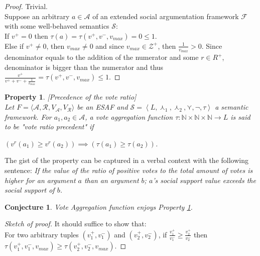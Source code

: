 \documentclass{article}
\newtheorem{property}{Property}
\newtheorem{conjecture}{Conjecture}
\newcommand{\nat}{\mathbb{N}}   %
\newcommand{\args}{\mathcal{A}} %
\newcommand{\att}{\mathcal{R}}  %
\newcommand{\valueset}{L}
\newcommand{\varg}{V_{\args}}   %
\newcommand{\vatt}{V_{\att}}   %
\newcommand{\safid}{F}               %
\newcommand{\saf}{\safid = \safbody} %
\newcommand{\safbody}{\langle \args, \att, \varg, \vatt \rangle} %
\newcommand{\semid}{\mathcal{S}}        %
\newcommand{\sembody}{\left\langle \valueset,\SAFand_1, \SAFand_2,\SAFor,\lnot,\tau \right\rangle}
\newcommand{\semdef}{\semid = \sembody}     %
\newcommand{\SAFand}{\curlywedge}     %
\newcommand{\SAFor}{\curlyvee}        %
\begin{document}
\begin{proof} Trivial.
\\
Suppose an arbitrary $a \in \args$ of an extended social argumentation framework $\mathcal{F}$ with some well-behaved semantics $\mathcal{S}$:\\
If $v^+ = 0$ then $\tau(a) = \tau(v^{+}, v^{-}, v_{max}) = 0 \le 1$. \\
Else if $v^+ \neq 0$, then $v_{max} \neq 0$ and since $v_{max} \in \mathcal{Z}^+$, then $\frac{1}{v_{max}} > 0.$ Since denominator equals to the addition of the numerator and some $r \in {R}^+ $, denominator is bigger than the numerator and thus \\
$ \frac{v^{+}}{v^{+}+v^{-}+\frac{1}{v_{max}}} = \tau(v^{+}, v^{-}, v_{max}) \le 1$.

\end{proof}

{\color{red}
\begin{property}
\label{P2}[Precedence of the vote ratio]\\
Let $\saf$ be an ESAF and $\semdef$ a semantic framework.  For $a_1, a_2 \in \args$, a vote aggregation function $\tau : \nat \times \nat \times \nat \to L$ is said to be "vote ratio precedent" if
\begin{center}
 $\left( v^{r}(a_{1}) \ge v^{r}(a_{2}) \right) \implies \left( \tau(a_1) \ge \tau(a_2) \right)$. 
\end{center}

\end{property}
}

The gist of the property can be captured in a verbal context with the following sentence: \emph{If the value of the ratio of positive votes to the total amount of votes is higher for an argument $a$ than an argument $b$; $a$'s social support value exceeds the social support of $b$.}  \\

\begin{conjecture}
Vote Aggregation function enjoys Property \ref{P2}.
\end{conjecture}

\begin{proof}  [Sketch of proof] It should suffice to show that:
\\
For two arbitrary tuples $(v^+_1, v^-_1)$ and $(v^+_2, v^-_2)$, if $\frac{v^+_1} {v^-_1} \ge \frac{v^+_2} {v^-_2}$ then $\tau(v^+_1, v^-_1, v_{max}) \ge \tau(v^+_2, v^-_2, v_{max})$. 

\end{proof}
\end{document}
